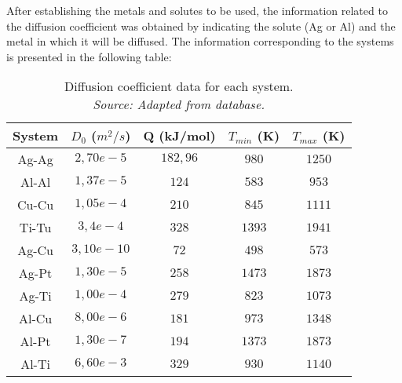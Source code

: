 After establishing the metals and solutes to be used, the information related to the diffusion coefficient was obtained by indicating the solute (Ag or Al) and the metal in which it will be diffused. The information corresponding to the systems is presented in the following table:
\begin{table}[t]
    \centering
    \captionsetup{justification=centering}
    \begin{tabular}{ccccc}
        System & $D_0$ ($m^2/s$) & Q (kJ/mol) & $T_{min}$ (K) & $T_{max}$ (K) \\ \hline \hline
        Ag-Ag & $2,70e-5$ & $182,96$ & $980$ & $1250$\\
        Al-Al & $1,37e-5$ & $124$ & $583$ & $953$ \\
        Cu-Cu & $1,05e-4$ & $210$ & $845$ & $1111$\\
        Ti-Tu & $3,4e-4$ & $328$ & $1393$ & $1941$ \\
        Ag-Cu & $3,10e-10$ & $72$ & $498$ & $573$\\
        Ag-Pt & $1,30e-5$ & $258$ & $1473$ & $1873$\\
        Ag-Ti & $1,00e-4$ & $279$ & $823$ & $1073$ \\
        Al-Cu & $8,00e-6$ & $181$ & $973$ & $1348$ \\
        Al-Pt & $1,30e-7$ & $194$ & $1373$ & $1873$\\
        Al-Ti & $6,60e-3$ & $329$ & $930$ & $1140$
    \end{tabular}
    \caption{Diffusion coefficient data for each system. \\
    \textit{Source: Adapted from \citep{kakusan} database.}}
    \label{tab:tabla2}
\end{table}